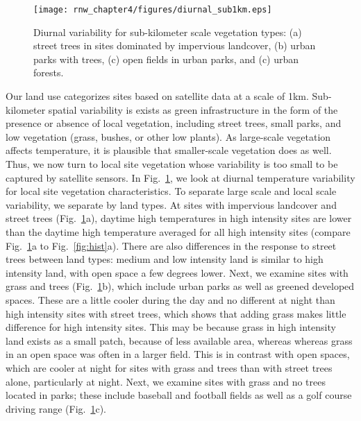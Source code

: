 \begin{figure}
\centering
\texttt{[image: rnw\_chapter4/figures/diurnal\_sub1km.eps]}
\caption{Diurnal variability for sub-kilometer scale vegetation types: (a) street trees in sites dominated by impervious landcover, (b) urban parks with trees, (c) open fields in urban parks, and (c) urban forests. }
\label{fig:diurnal_urbanforests_etc}
\end{figure}

Our land use categorizes sites based on satellite data at a scale of 1km.  Sub-kilometer spatial variability is exists as green infrastructure in the form of the presence or absence of local vegetation, including street trees, small parks, and low vegetation (grass, bushes, or other low plants). As large-scale vegetation affects temperature, it is plausible that smaller-scale vegetation does as well. 
Thus, we now turn to local site vegetation whose variability is too small to be captured by satellite sensors. 
In Fig.~\ref{fig:diurnal_urbanforests_etc}, we look at diurnal temperature variability for local site vegetation characteristics. To separate large scale and local scale variability, we separate by land types. 
At sites with impervious landcover and street trees (Fig.~\ref{fig:diurnal_urbanforests_etc}a), %
daytime high temperatures in high intensity sites are lower than the daytime high temperature averaged for all high intensity sites (compare Fig.~\ref{fig:diurnal_urbanforests_etc}a to Fig.~\ref{fig:hist}a).
There are also differences in the response to street trees between land types: 
medium and low intensity land is similar to high intensity land, with open space a few degrees lower. 
Next, we examine sites with grass and trees (Fig.~\ref{fig:diurnal_urbanforests_etc}b), which include urban parks as well as greened developed spaces. These are a little cooler during the day and no different at night than high intensity sites with street trees, which shows that adding grass makes little difference for high intensity sites. 
This may be because grass in high intensity land exists as a small patch, because of less available area, whereas
whereas grass in an open space was often in a larger field. 
This is in contrast with open spaces, which are cooler at night for sites with grass and trees than with street trees alone, particularly at night. Next, we examine sites with grass and no trees located in parks; these include baseball and football fields as well as a golf course driving range (Fig.~\ref{fig:diurnal_urbanforests_etc}c). 

